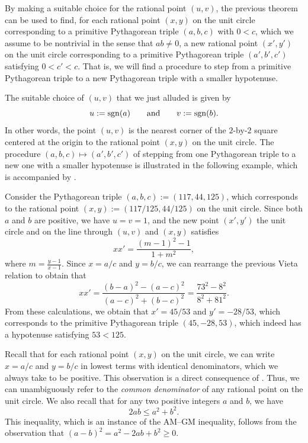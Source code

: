 By making a suitable choice for the rational point $(u,v)$, the previous theorem can be used to find, for each rational point $(x,y)$ on the unit circle corresponding to a primitive Pythagorean triple $(a,b,c)$ with $0<c$, which we assume to be nontrivial in the sense that $ab\neq 0$, a new rational point $(x',y')$ on the unit circle corresponding to a primitive Pythagorean triple $(a',b',c')$ satisfying $0<c'<c$. That is, we will find a procedure to step from a primitive Pythagorean triple to a new Pythagorean triple with a smaller hypotenuse.

The suitable choice of $(u,v)$ that we just alluded is given by
\begin{equation*}
  u:= \operatorname{sgn}(a)\qquad\text{and}\qquad v:=\operatorname{sgn}(b).
\end{equation*}
In other words, the point $(u,v)$ is the nearest corner of the $2$-by-$2$ square centered at the origin to the rational point $(x,y)$ on the unit circle.
The procedure $(a,b,c)\mapsto (a',b',c')$ of stepping from one Pythagorean triple to a new one with a smaller hypotenuse is illustrated in the following example, which is accompanied by .

\begin{example}
  Consider the Pythagorean triple $(a,b,c):=(117,44,125)$, which corresponds to the rational point $(x,y):=(117/125,44/125)$ on the unit circle. Since both $a$ and $b$ are positive, we have $u=v=1$, and the new point $(x',y')$ the unit circle and on the line through $(u,v)$ and $(x,y)$ satisfies
  \begin{equation*}
    xx'=\frac{(m-1)^2-1}{1+m^2},
  \end{equation*}
  where $m=\tfrac{y-1}{x-1}$. Since $x=a/c$ and $y=b/c$, we can rearrange the previous Vieta relation to obtain that
  \begin{equation*}
    xx'=\frac{(b-a)^2-(a-c)^2}{(a-c)^2+(b-c)^2}=\frac{73^2-8^2}{8^2+81^2}.
  \end{equation*}
  From these calculations, we obtain that $x'=45/53$ and $y'=-28/53$, which corresponds to the primitive Pythagorean triple $(45,-28,53)$, which indeed has a hypotenuse satisfying $53<125$.
\end{example}

Recall that for each rational point $(x,y)$ on the unit circle, we can write $x=a/c$ and $y=b/c$ in lowest terms with identical denominators, which we always take to be positive. This observation is a direct consequence of . Thus, we can unambiguously refer to the \emph{common denominator} of any rational point on the unit circle. We also recall that for any two positive integers $a$ and $b$, we have
\begin{equation*}\label{equation:instance-am-gm}
  2ab\leq a^2+b^2. \tag{\textasteriskcentered}
\end{equation*}
This inequality, which is an instance of the AM--GM inequality, follows from the observation that $(a-b)^2=a^2-2ab+b^2\geq 0$.

